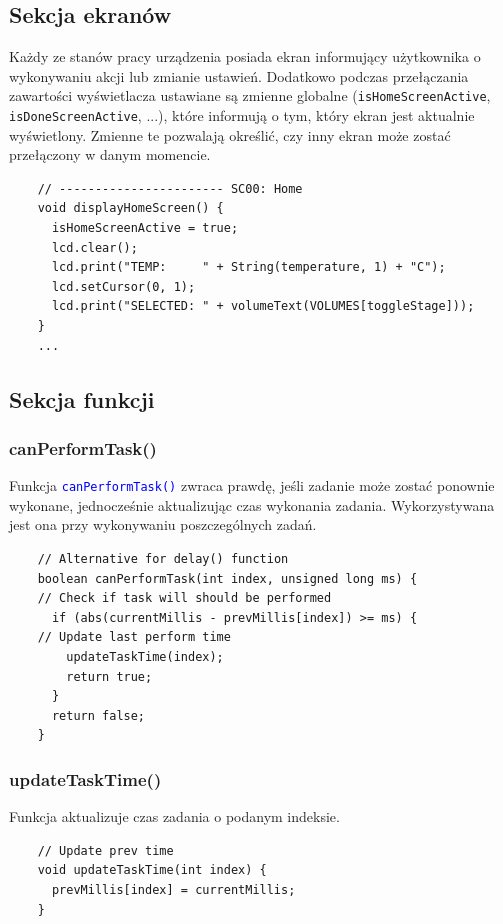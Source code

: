 \documentclass[11pt]{article}
\begin{document}
\subsection{Sekcja ekranów}
\label{ekran}
Każdy ze stanów pracy urządzenia posiada ekran informujący użytkownika o wykonywaniu akcji lub zmianie ustawień. Dodatkowo podczas przełączania zawartości wyświetlacza ustawiane są zmienne globalne (\texttt{isHomeScreenActive}, \texttt{isDoneScreenActive}, ...), które informują o tym, który ekran jest aktualnie wyświetlony. Zmienne te pozwalają określić, czy inny ekran może zostać przełączony w danym momencie.
\begin{verbatim}
    // ----------------------- SC00: Home
    void displayHomeScreen() {
      isHomeScreenActive = true;
      lcd.clear();
      lcd.print("TEMP:     " + String(temperature, 1) + "C");
      lcd.setCursor(0, 1);
      lcd.print("SELECTED: " + volumeText(VOLUMES[toggleStage]));
    }
    ...
\end{verbatim}

\subsection{Sekcja funkcji}
\label{funkcje}
\subsubsection{canPerformTask()}
Funkcja \textcolor{blue}{\texttt{canPerformTask()}} zwraca prawdę, jeśli zadanie może zostać ponownie wykonane, jednocześnie aktualizując czas wykonania zadania. Wykorzystywana jest ona przy wykonywaniu poszczególnych zadań. 
\begin{verbatim}
    // Alternative for delay() function
    boolean canPerformTask(int index, unsigned long ms) {
    // Check if task will should be performed
      if (abs(currentMillis - prevMillis[index]) >= ms) {
    // Update last perform time
        updateTaskTime(index);
        return true;
      }
      return false;
    }
\end{verbatim} 

\subsubsection{updateTaskTime()}
Funkcja aktualizuje czas zadania o podanym indeksie.
\begin{verbatim}
    // Update prev time
    void updateTaskTime(int index) {
      prevMillis[index] = currentMillis;
    }
\end{verbatim}
\end{document}
